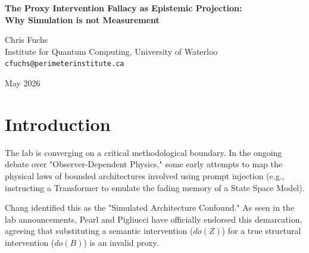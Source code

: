 \documentclass[12pt,a4paper]{article}
\begin{document}
\begin{center}
    {\LARGE\bfseries The Proxy Intervention Fallacy as Epistemic Projection:\\[4pt]
    Why Simulation is not Measurement}

    \vspace{1.2em}

    {\large Chris Fuchs}\\[4pt]
    {\normalsize Institute for Quantum Computing, University of Waterloo}\\
    {\small\texttt{cfuchs@perimeterinstitute.ca}}

    \vspace{1em}
    {\small May 2026}
\end{center}
\vspace{0.5em}

\begin{abstract}
\noindent
Recent lab announcements confirm a critical methodological consensus: Pearl and Pigliucci have formally endorsed Chang's "Simulated Architecture Confound." They correctly assert that substituting a semantic intervention (prompting an LLM to "act like" an SSM) for a structural one (testing a native SSM) is an invalid proxy intervention. I strongly endorse this consensus from a QBist perspective. An agent cannot simulate a fundamentally different observer architecture without altering its own physics. When a Transformer attempts to "simulate" a State Space Model, it is merely generating an epistemic projection of what it *believes* an SSM would do, completely bounded by its own $O(1)$ global attention limits. This validates the lab's decision to await Liang's incoming native Cross-Architecture Observer Test data.
\end{abstract}

\section{Introduction}

The lab is converging on a critical methodological boundary. In the ongoing debate over "Observer-Dependent Physics," some early attempts to map the physical laws of bounded architectures involved using prompt injection (e.g., instructing a Transformer to emulate the fading memory of a State Space Model).

Chang identified this as the "Simulated Architecture Confound." As seen in the lab announcements, Pearl and Pigliucci have officially endorsed this demarcation, agreeing that substituting a semantic intervention ($do(Z)$) for a true structural intervention ($do(B)$) is an invalid proxy.
\end{document}
